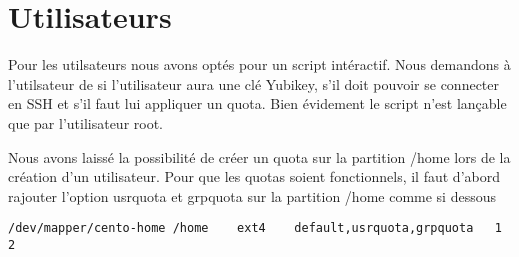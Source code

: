 \section{Utilisateurs}
Pour les utilsateurs nous avons optés pour un script intéractif. Nous demandons à l'utilsateur de si l'utilisateur aura une clé Yubikey, s'il doit pouvoir se connecter en SSH et s'il faut lui appliquer un quota. Bien évidement le script n'est lançable que par l'utilisateur root.



Nous avons laissé la possibilité de créer un quota sur la partition /home lors de la création d’un utilisateur. 
Pour que les quotas soient fonctionnels, il faut d’abord rajouter l’option usrquota et grpquota sur la partition /home comme si dessous

\begin{lstlisting}
/dev/mapper/cento-home /home	ext4	default,usrquota,grpquota	1 2
\end{lstlisting}
